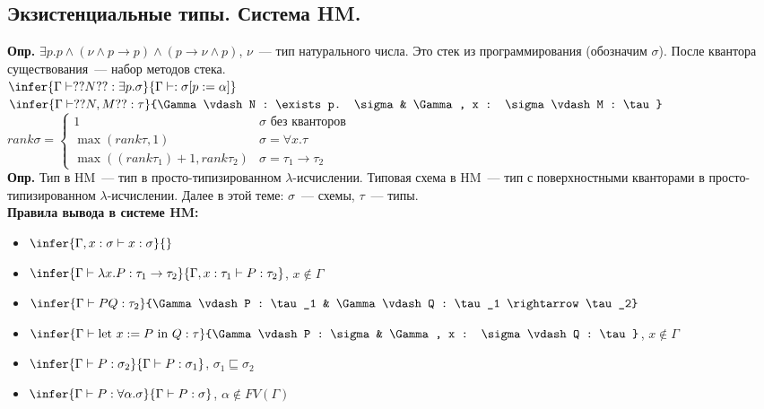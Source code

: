 \documentclass{article}
\begin{document}
	\subsection{Экзистенциальные типы. Система HM.}
	\textbf{Опр.} $\exists p. p \wedge (\nu \wedge p \rightarrow p) \wedge (p \rightarrow \nu \wedge p)$, $\nu$~--- тип натурального числа. Это стек из программирования (обозначим $\sigma$). После квантора существования~--- набор методов стека. \\
	$\infer{\Gamma \vdash ?? N ?? : \exists p. \sigma}{\Gamma \vdash : \sigma [p := \alpha]}$ \\
	$\infer{\Gamma \vdash ?? N, M ??: \tau}{\Gamma \vdash N : \exists p. \sigma & \Gamma, x : \sigma \vdash M : \tau}$ \\
	$rank \sigma =
	\begin{cases}
		1 & \sigma \text{ без кванторов} \\
		\max(rank \tau, 1) & \sigma = \forall x. \tau \\
		\max((rank \tau_1) + 1, rank \tau_2) & \sigma = \tau_1 \rightarrow \tau_2
	\end{cases}
	$ \\
	\textbf{Опр.} Тип в HM~--- тип в просто-типизированном $\lambda$-исчислении. Типовая схема в HM~--- тип с поверхностными кванторами в просто-типизированном $\lambda$-исчислении. Далее в этой теме: $\sigma$~--- схемы, $\tau$~--- типы. \\
	\textbf{Правила вывода в системе HM:}
	\begin{itemize}
		\item $\infer{\Gamma, x : \sigma \vdash x : \sigma}{}$
		\item $\infer{\Gamma \vdash \lambda x. P : \tau_1 \rightarrow \tau_2}{\Gamma, x : \tau_1 \vdash P : \tau_2}$, $x \not\in \Gamma$
		\item $\infer{\Gamma \vdash PQ : \tau_2}{\Gamma \vdash P : \tau_1 & \Gamma \vdash Q : \tau_1 \rightarrow \tau_2}$
		\item $\infer{\Gamma \vdash \text{let } x := P \text{ in } Q : \tau}{\Gamma \vdash P : \sigma & \Gamma, x : \sigma \vdash Q : \tau}$, $x \not\in \Gamma$
		\item $\infer{\Gamma \vdash P : \sigma_2}{\Gamma \vdash P : \sigma_1}$, $\sigma_1 \sqsubseteq \sigma_2$
		\item $\infer{\Gamma \vdash P : \forall \alpha. \sigma}{\Gamma \vdash P : \sigma}$, $\alpha \not\in FV(\Gamma)$
	\end{itemize}
\end{document}
